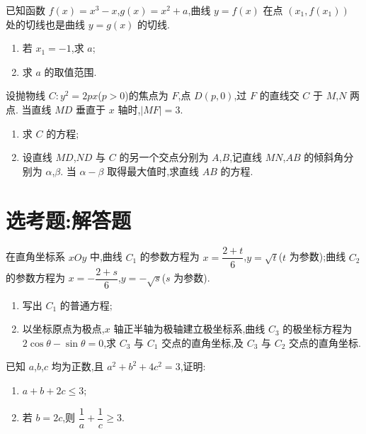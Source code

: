 \begin{problem}
已知函数 \(f(x)=x^3-x\),\(g(x)=x^2+a\),曲线 \(y=f(x)\) 在点 \(\left(x_1,f(x_1)\right)\) 处的切线也是曲线 \(y=g(x)\) 的切线.

\begin{enumerate}
\item 若 \(x_1=-1\),求 \(a\);
\item 求 \(a\) 的取值范围.
\end{enumerate}
\end{problem}

\begin{problem}
设抛物线 \(C:y^2=2px\)(\(p>0\))的焦点为 \(F\),点 \(D\left(p,0\right)\),过 \(F\) 的直线交 \(C\) 于 \(M\),\(N\) 两点. 当直线 \(MD\) 垂直于 \(x\) 轴时,\(\lvert MF\rvert=3\).

\begin{enumerate}
\item 求 \(C\) 的方程;
\item 设直线 \(MD\),\(ND\) 与 \(C\) 的另一个交点分别为 \(A\),\(B\),记直线 \(MN\),\(AB\) 的倾斜角分别为 \(\alpha\),\(\beta\). 当 \(\alpha-\beta\) 取得最大值时,求直线 \(AB\) 的方程.
\end{enumerate}
\end{problem}

\section{选考题:解答题}

\begin{problem}
在直角坐标系 \(xOy\) 中,曲线 \(C_1\) 的参数方程为 \(x=\dfrac{2+t}{6}\),\(y=\sqrt{t}\)(\(t\) 为参数);曲线 \(C_2\) 的参数方程为 \(x=-\dfrac{2+s}{6}\),\(y=-\sqrt{s}\)(\(s\) 为参数).

\begin{enumerate}
\item 写出 \(C_1\) 的普通方程;
\item 以坐标原点为极点,\(x\) 轴正半轴为极轴建立极坐标系,曲线 \(C_3\) 的极坐标方程为 \(2\cos\theta-\sin\theta=0\),求 \(C_3\) 与 \(C_1\) 交点的直角坐标,及 \(C_3\) 与 \(C_2\) 交点的直角坐标.
\end{enumerate}
\end{problem}

\begin{problem}
已知 \(a\),\(b\),\(c\) 均为正数,且 \(a^2+b^2+4c^2=3\),证明:

\begin{enumerate}
\item \(a+b+2c\le3\);
\item 若 \(b=2c\),则 \(\dfrac{1}{a}+\dfrac{1}{c}\ge3\).
\end{enumerate}
\end{problem}

